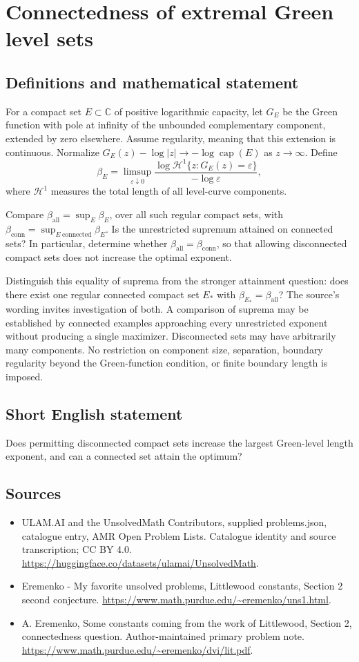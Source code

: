 \documentclass[11pt,a4paper]{article}
\begin{document}
\section*{Connectedness of extremal Green level sets}\label{statement}

\subsection{Definitions and mathematical statement}
For a compact set $E\subset\mathbb C$ of positive
logarithmic capacity, let $G_E$ be the Green
function with pole at infinity of the unbounded
complementary component, extended by zero elsewhere.
Assume regularity, meaning that this extension
is continuous. Normalize
$G_E(z)-\log|z|\to-\log\operatorname{cap}(E)$
as $z\to\infty$.
Define
\[
 \beta_E=\limsup_{\varepsilon\downarrow0}
 \frac{\log\mathcal H^1\{z:G_E(z)=\varepsilon\}}
                         {-\log\varepsilon},
\]
where $\mathcal H^1$ measures the total length
of all level-curve components.

Compare
$\beta_{\mathrm{all}}=\sup_E\beta_E$, over
all such regular compact sets, with
$\beta_{\mathrm{conn}}=\sup_{E\ \mathrm{connected}}\beta_E$.
Is the unrestricted supremum attained on
connected sets? In particular, determine whether
$\beta_{\mathrm{all}}=\beta_{\mathrm{conn}}$,
so that allowing disconnected compact sets
does not increase the optimal exponent.

Distinguish this equality of suprema from the
stronger attainment question: does there exist
one regular connected compact set $E_*$ with
$\beta_{E_*}=\beta_{\mathrm{all}}$? The
source's wording invites investigation of both.
A comparison of suprema may be established
by connected examples approaching every
unrestricted exponent without producing a
single maximizer.
Disconnected sets may have arbitrarily many
components. No restriction on component size,
separation, boundary regularity beyond the
Green-function condition, or finite boundary
length is imposed.
\subsection{Short English statement}
Does permitting disconnected compact sets increase the largest Green-level length exponent, and can a connected set attain the optimum?
\subsection{Sources}
\begin{itemize}
\item[S1] ULAM.AI and the UnsolvedMath Contributors, supplied problems.json, catalogue entry, AMR Open Problem Lists. Catalogue identity and source transcription; CC BY 4.0.
\url{https://huggingface.co/datasets/ulamai/UnsolvedMath}.
\item[S2] Eremenko - My favorite unsolved problems, Littlewood constants, Section 2 second conjecture. 
\url{https://www.math.purdue.edu/~eremenko/uns1.html}.
\item[S3] A. Eremenko, Some constants coming from the work of Littlewood, Section 2, connectedness question. Author-maintained primary problem note.
\url{https://www.math.purdue.edu/~eremenko/dvi/lit.pdf}.
\end{itemize}
\end{document}
